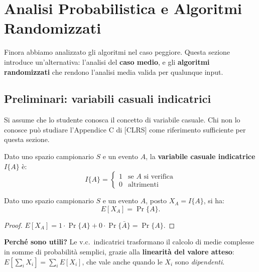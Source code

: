 \section{Analisi Probabilistica e Algoritmi Randomizzati}

\begin{softnote}
	Finora abbiamo analizzato gli algoritmi nel caso peggiore.
	Questa sezione introduce un'alternativa: l'analisi del
	\textbf{caso medio}, e gli \textbf{algoritmi randomizzati}
	che rendono l'analisi media valida per qualunque input.
\end{softnote}

\subsection{Preliminari: variabili casuali indicatrici}

\begin{nota}
	Si assume che lo studente conosca il concetto di variabile casuale.
	Chi non lo conosce può studiare l'Appendice C di [CLRS] come
	riferimento sufficiente per questa sezione.
\end{nota}

\begin{definizione}
	Dato uno spazio campionario $S$ e un evento $A$, la
	\textbf{variabile casuale indicatrice} $I\{A\}$ è:
	\[
	I\{A\} = \begin{cases} 1 & \text{se } A \text{ si verifica} \\
		0 & \text{altrimenti} \end{cases}
	\]
\end{definizione}

\begin{lemma}
	Dato uno spazio campionario $S$ e un evento $A$, posto
	$X_A = I\{A\}$, si ha:
	\[
	E[X_A] = \Pr\{A\}.
	\]
\end{lemma}
\begin{proof}
	$E[X_A] = 1\cdot\Pr\{A\} + 0\cdot\Pr\{\bar{A}\} = \Pr\{A\}$.
\end{proof}

\begin{nota}
	\textbf{Perché sono utili?} Le v.c.\ indicatrici trasformano il
	calcolo di medie complesse in somme di probabilità semplici,
	grazie alla \textbf{linearità del valore atteso}:
	$E\!\left[\sum_i X_i\right] = \sum_i E[X_i]$,
	che vale anche quando le $X_i$ sono \textit{dipendenti}.
\end{nota}

